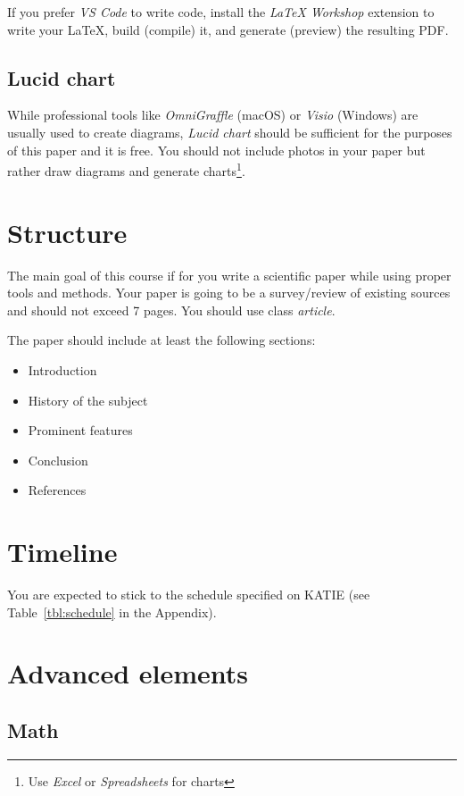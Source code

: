 \documentclass[11pt]{article}
\begin{document}
If you prefer \emph{VS Code} to write code, install the \emph{LaTeX Workshop} extension to write your \LaTeX, build (compile) it, and generate (preview) the resulting PDF.

\subsection{Lucid chart}

While professional tools like \emph{OmniGraffle} (macOS) or \emph{Visio} (Windows) are usually used to create diagrams, \emph{Lucid chart} should be sufficient for the purposes of this paper and it is free. You should not include photos in your paper but rather draw diagrams and generate charts\footnote{Use \emph{Excel} or \emph{Spreadsheets} for charts}.

\section{Structure}

The main goal of this course if for you write a scientific paper while using proper tools and methods. Your paper is going to be a survey/review of existing sources and should not exceed 7 pages. You should use class \emph{article}.

The paper should include at least the following sections:

\begin{itemize}
    \item Introduction
    \item History of the subject
    \item Prominent features
    \item Conclusion
    \item References
\end{itemize}

\section{Timeline}

You are expected to stick to the schedule specified on KATIE (see Table~\ref{tbl:schedule} in the Appendix).

\section{Advanced elements}

\subsection{Math}
\end{document}

